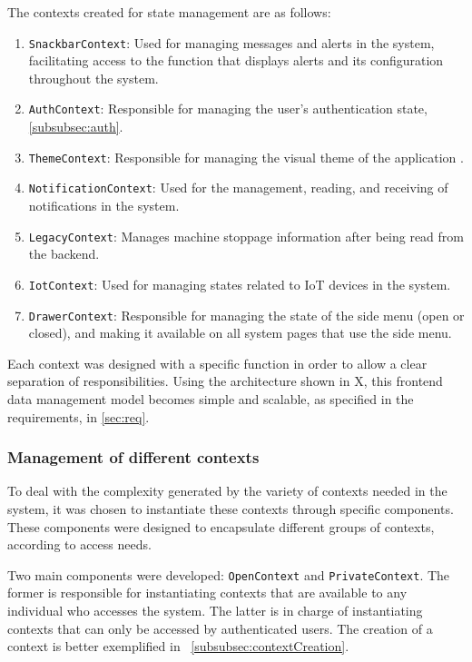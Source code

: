 The contexts created for state management are as follows:
\begin{enumerate}
    \item \texttt{SnackbarContext}: Used for managing messages and alerts in the system, facilitating access to the function that displays alerts and its configuration throughout the system.
    \item \texttt{AuthContext}: Responsible for managing the user's authentication state, \ref{subsubsec:auth}.
    \item \texttt{ThemeContext}: Responsible for managing the visual theme of the application \cite{muiDefaultTheme}.
    \item \texttt{NotificationContext}: Used for the management, reading, and receiving of notifications in the system.
    \item \texttt{LegacyContext}: Manages machine stoppage information after being read from the backend.
    \item \texttt{IotContext}: Used for managing states related to IoT devices in the system.
    \item \texttt{DrawerContext}: Responsible for managing the state of the side menu (open or closed), and making it available on all system pages that use the side menu.
\end{enumerate}

Each context was designed with a specific function in order to allow a clear separation of responsibilities. Using the architecture shown in X, this frontend data management model becomes simple and scalable, as specified in the requirements, in \ref{sec:req}.

\subsubsection{Management of different contexts}\label{subsubsec:difContexts}
To deal with the complexity generated by the variety of contexts needed in the system, it was chosen to instantiate these contexts through specific components. These components were designed to encapsulate different groups of contexts, according to access needs.

Two main components were developed: \texttt{OpenContext} and \texttt{PrivateContext}. The former is responsible for instantiating contexts that are available to any individual who accesses the system. The latter is in charge of instantiating contexts that can only be accessed by authenticated users. The creation of a context is better exemplified in ~\ref{subsubsec:contextCreation}.

